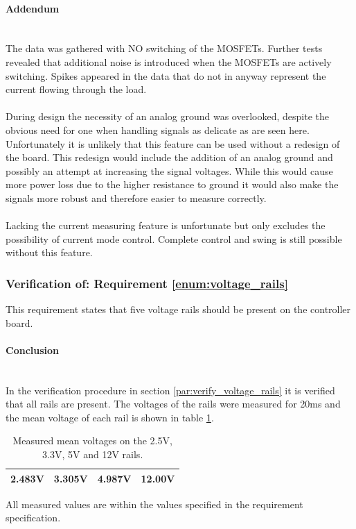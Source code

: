 \paragraph{Addendum}~\\
The data was gathered with NO switching of the MOSFETs.
Further tests revealed that additional noise is introduced when the MOSFETs are actively switching.
Spikes appeared in the data that do not in anyway represent the current flowing through the load.
\\~\\
During design the necessity of an analog ground was overlooked, despite the obvious need for one when handling signals as delicate as are seen here.
Unfortunately it is unlikely that this feature can be used without a redesign of the board.
This redesign would include the addition of an analog ground and possibly an attempt at increasing the signal voltages.
While this would cause more power loss due to the higher resistance to ground it would also make the signals more robust and therefore easier to measure correctly.
\\~\\
Lacking the current measuring feature is unfortunate but only excludes the possibility of current mode control.
Complete control and swing is still possible without this feature.

\subsubsection{Verification of: Requirement \ref{enum:voltage_rails}} %
\label{ssub:requirement_enum:voltage_rails}
This requirement states that five voltage rails should be present on the controller board. 

\paragraph{Conclusion}~\\
In the verification procedure in section \ref{par:verify_voltage_rails} it is verified that all rails are present.
The voltages of the rails were measured for 20ms and the mean voltage of each rail is shown in table \ref{tab:meas_rails}.
\begin{table}[]
\centering
\begin{tabular}{|l|l|l|l|}
\hline
2.483V & 3.305V & 4.987V & 12.00V \\
\hline
\end{tabular}
\caption{Measured mean voltages on the 2.5V, 3.3V, 5V and 12V rails.}
\label{tab:meas_rails}
\end{table}
All measured values are within the values specified in the requirement specification.


